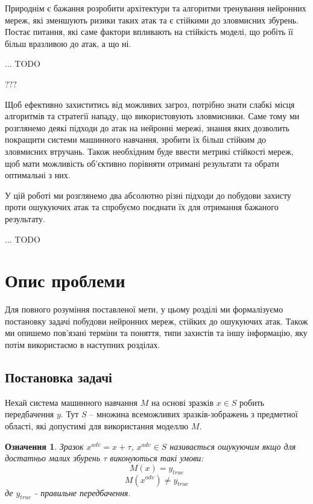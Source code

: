\documentclass[14pt,a4paper]{extarticle}
\newcounter{e}
\newtheorem{defn}[theorem]{Означення}
\numberwithin{equation}{section}
\numberwithin{figure}{section}
\begin{document}
Природнім є бажання розробити архітектури та алгоритми тренування нейронних мереж, які зменшують ризики таких атак та є стійкими до зловмисних збурень. Постає питання, які саме фактори впливають на стійкість моделі, що робіть її більш вразливою до атак, а що ні. 

... TODO


???

Щоб ефективно захиститись від можливих загроз, потрібно знати слабкі місця алгоритмів та стратегії нападу, що використовують зловмисники. Саме тому ми розглянемо деякі підходи до атак на нейронні мережі, знання яких дозволить покращити системи машинного навчання, зробити їх більш стійким до зловмисних втручань. Також необхідним буде ввести метрикі стійкості мереж, щоб мати можливість об'єктивно порівняти отримані результати та обрати оптимальні з них. 



У цій роботі ми розглянемо два 
абсолютно різні
 підходи до побудови захисту проти ошукуючих атак та спробуємо поєднати їх для отримання бажаного результату.

... TODO






 
 \newpage
 \thispagestyle{empty}
 \section{Опис проблеми}
 
 Для повного розуміння поставленої мети, у цьому розділі ми формалізуємо постановку задачі побудови нейронних мереж, стійких до ошукуючих атак. Також ми опишемо пов'язані терміни та поняття, типи захистів та іншу інформацію, яку потім використаємо в наступних розділах.
 
 \subsection{Постановка задачі}
 
 Нехай система машинного навчання $M$ на основі зразків $x \in S$ робить передбачення $y$. Тут $S$ -- множина всеможливих зразків-зображень з предметної області, які допустимі для використання моделлю $M$.
 
 \begin{defn}
 	Зразок $x^{adv} = x + \tau$, $x^{adv} \in S$ називається ошукуючим якщо для достатньо малих збурень $\tau$ виконуються такі умови:  
 	\begin{equation}
	 	M(x) = y_{true}
	\end{equation}
	\begin{equation}
	 	M(x^{adv}) \neq y_{true}
 	\end{equation}
 	де $y_{true}$ - правильне передбачення. 
 \end{defn}
 
\end{document}
